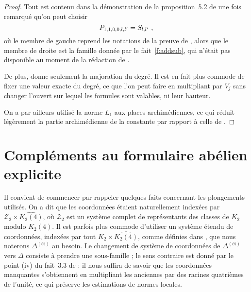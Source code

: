 \begin{proof} \later
  Tout est contenu dans la démonstration de la proposition~5.2 de \cite[pp.
  126-128]{remivds} une fois remarqué qu'on peut choisir
  \begin{equation}
    P_{1, 1, 0, 0, l, l'} = S_{l, l'}
    \text{ ,}
  \end{equation}
  où le membre de gauche reprend les notations de la preuve de ,
  alors que le membre de droite est la famille donnée par le
  fait~\ref{f:addsub}, qui n'était pas disponible au moment de la
  rédaction de \cite{remivds}.

  De plus,  donne seulement la majoration du degré. Il est en
  fait plus commode de fixer une valeur exacte du degré, ce que l'on peut
  faire en multipliant par $V_j$ sans changer l'ouvert sur lequel les
  formules sont valables, ni leur hauteur.

  On a par ailleurs utilisé la norme $L_1$ aux places archimédiennes, ce qui
  réduit légèrement la partie archimédienne de la constante par rapport à
  celle de .
\end{proof}

\stopout


\section{Compléments au formulaire abélien explicite} \label{sec:form-ab2}

Il convient de commencer par rappeler quelques faits concernant les
plongements utilisés. On a dit que les coordonnées étaient naturellement
indexées par $\mathcal{Z}_2 \times \widehat{K_2(4)}$, où $\mathcal{Z}_2$ est
un système complet de représentants des classes de $K_2$ modulo $K_2(4)$. Il
est parfois plus commode d'utiliser un système étendu de coordonnées, indexées
par tout $K_2 \times \widehat{K_2(4)}$, comme définies dans
\cite[p.~651]{daphimhva2}, que nous noterons $\Delta^{(\text{ét})}$ au
besoin. Le changement de système de coordonnées de $\Delta^{(\text{ét})}$ vers
$\Delta$ consiste à prendre une sous-famille ; le sens contraire est donné par
le point (iv) du fait~3.3 de  : il nous suffira de savoir que
les coordonnées manquantes s'obtiennent en multipliant les anciennes par des
racines quatrièmes de l'unité, ce qui préserve les estimations de normes
locales.

